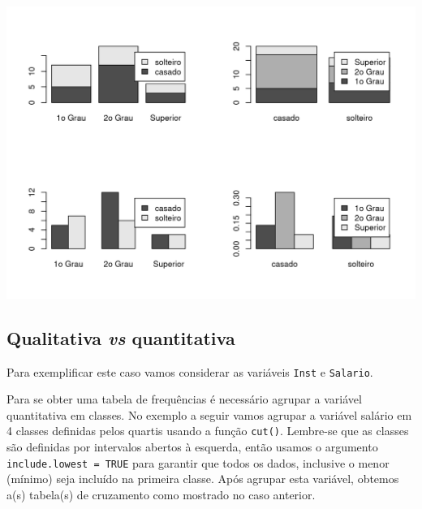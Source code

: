 \documentclass[
  10pt,
  a4paper]{book}
\begin{document}
\begin{center}\includegraphics{figures/unnamed-chunk-319-1} \end{center}

\hypertarget{qualitativa-vs-quantitativa}{%
\subsection{\texorpdfstring{Qualitativa \emph{vs} quantitativa}{Qualitativa vs quantitativa}}\label{qualitativa-vs-quantitativa}}

Para exemplificar este caso vamos considerar as variáveis \texttt{Inst} e
\texttt{Salario}.

Para se obter uma tabela de frequências é necessário agrupar a variável
quantitativa em classes. No exemplo a seguir vamos agrupar a variável
salário em 4 classes definidas pelos quartis usando a função \texttt{cut()}.
Lembre-se que as classes são definidas por intervalos abertos à esquerda,
então usamos o argumento \texttt{include.lowest\ =\ TRUE} para garantir que todos
os dados, inclusive o menor (mínimo) seja incluído na primeira classe.
Após agrupar esta variável, obtemos a(s) tabela(s) de cruzamento como
mostrado no caso anterior.
\end{document}
